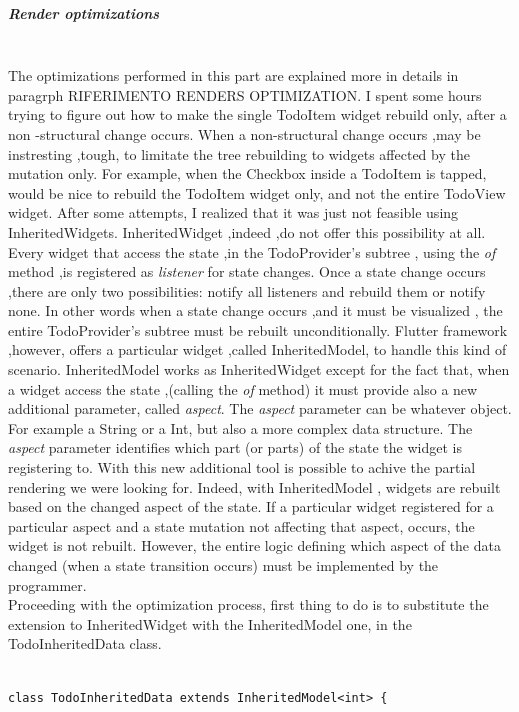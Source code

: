 \subparagraph{Render optimizations} \mbox{} \\
\label{subpar:render_optimizations_inherited_widget}
The optimizations performed in this part are explained more in details in paragrph RIFERIMENTO RENDERS OPTIMIZATION. I spent some hours trying to figure out how to make the single TodoItem widget rebuild only, after a non -structural change occurs. When a non-structural change occurs ,may be instresting ,tough, to limitate the tree rebuilding  to widgets affected by the mutation only. For example, when the Checkbox inside a TodoItem is tapped, would be nice to rebuild the TodoItem widget only, and not the entire TodoView widget. After some attempts, I realized that it was just not feasible using InheritedWidgets. InheritedWidget ,indeed ,do not offer this possibility at all. Every widget that access the state ,in the TodoProvider’s subtree , using the \textit{of} method ,is registered as \textit{listener} for state changes. Once a state change occurs ,there are only two possibilities: notify all listeners and rebuild them or notify none. In other words when a state change occurs ,and it must be visualized , the entire TodoProvider’s subtree must be rebuilt unconditionally. Flutter framework ,however, offers a particular widget ,called InheritedModel, to handle this kind of scenario. InheritedModel works as InheritedWidget except for the fact that, when a widget access the state ,(calling the \textit{of} method) it must provide also a new additional parameter, called \textit{aspect}. The \textit{aspect} parameter can be whatever object. For example a String or a Int, but also a more complex data structure. The \textit{aspect} parameter identifies which part (or parts) of the state the widget is registering to. 
With this new additional tool is possible to achive the partial rendering we were looking for. Indeed, with InheritedModel , widgets are rebuilt based on the changed aspect of the state. If a particular widget registered for a particular aspect and a state mutation not affecting that aspect, occurs, the widget is not rebuilt. However, the entire logic defining which aspect of the data changed (when a state transition occurs) must be implemented by the programmer.\\
Proceeding with the optimization process, first thing to do is to substitute the extension to InheritedWidget with the InheritedModel one, in the
TodoInheritedData class.
\mbox{}\\
\begin{code}
\mbox{}
\label{code:2.44}
\begin{verbatim}

class TodoInheritedData extends InheritedModel<int> {
\end{verbatim}
\end{code}
